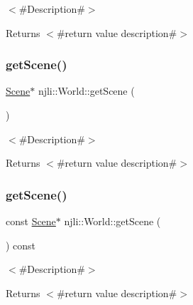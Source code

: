 $<$\#\+Description\#$>$

\begin{DoxyReturn}{Returns}
$<$\#return value description\#$>$ 
\end{DoxyReturn}
\mbox{\label{classnjli_1_1_world_aacef8d7932cbc6df28524a15b30b50f5}} 
\subsubsection{\texorpdfstring{get\+Scene()}{getScene()}\hspace{0.1cm}{\footnotesize\ttfamily [1/2]}}
{\footnotesize\ttfamily \mbox{\hyperlink{classnjli_1_1_scene}{Scene}}$\ast$ njli\+::\+World\+::get\+Scene (\begin{DoxyParamCaption}{ }\end{DoxyParamCaption})}

$<$\#\+Description\#$>$

\begin{DoxyReturn}{Returns}
$<$\#return value description\#$>$ 
\end{DoxyReturn}
\mbox{\label{classnjli_1_1_world_a007a67243897e4dd1448e97b6b860389}} 
\subsubsection{\texorpdfstring{get\+Scene()}{getScene()}\hspace{0.1cm}{\footnotesize\ttfamily [2/2]}}
{\footnotesize\ttfamily const \mbox{\hyperlink{classnjli_1_1_scene}{Scene}}$\ast$ njli\+::\+World\+::get\+Scene (\begin{DoxyParamCaption}{ }\end{DoxyParamCaption}) const}

$<$\#\+Description\#$>$

\begin{DoxyReturn}{Returns}
$<$\#return value description\#$>$ 
\end{DoxyReturn}
\mbox{\label{classnjli_1_1_world_ac65ea60b2f5033c2e8a7504820d59ac5}} 
